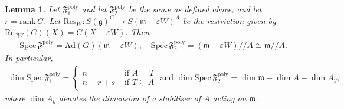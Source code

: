 \documentclass[11pt]{amsart}
\newtheorem{lemma}[theorem]{Lemma}
\theoremstyle{definition}
\theoremstyle{plain}
\theoremstyle{conclusion}
\begin{document}
\begin{lemma}
\label{lem:rankacc}
 Let  $ \mathfrak{F}_1^{\mathrm{poly}} $ and let $ \mathfrak{F}_2^{\mathrm{poly}}$ be the same as defined above, and let $r = \mathrm{rank} \,G$. Let $\mathrm{Res}_W: S(\mathfrak{g})^G \rightarrow S(\mathfrak{m}-\varepsilon W)^A$ be the restriction given by $\mathrm{Res}_W(C)(X) = C(X - \varepsilon W)$. Then\begin{align*}
  \mathrm{Spec}\, \mathfrak{F}_1^{\mathrm{poly}}=\mathrm{Ad}(G)(\mathfrak{m}-\varepsilon W),\quad \mathrm{Spec}\,\mathfrak{F}_2^{\mathrm{poly}}=(\mathfrak{m}-\varepsilon W)//A \cong  \mathfrak{m}//A .  
\end{align*} In particular, \begin{align*}
    \dim \mathrm{Spec} \,\mathfrak{F}_1^{\mathrm{poly}} = \left\{\begin{matrix}
        n & \text{ if } A = T \\
        n- r +  s & \text{ if } T \subsetneq A
    \end{matrix}\right. \text{ and } \dim \mathrm{Spec}\, \mathfrak{F}_2^{\mathrm{poly}} = \dim \mathfrak{m} - \dim A +  \dim A_y,
\end{align*} where $\dim A_y$ denotes the dimension of a stabiliser of $A$ acting on $\mathfrak{m}$.
\end{lemma}
\end{document}
